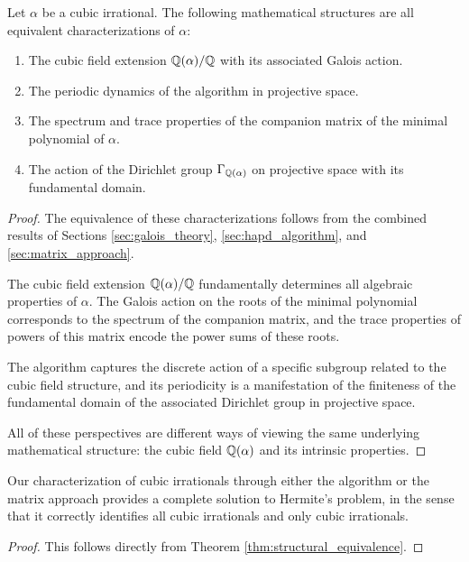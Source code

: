 \begin{theorem}\label{thm:theoretical_unification}
Let $\alpha$ be a cubic irrational. The following mathematical structures are all equivalent characterizations of $\alpha$:
\begin{enumerate}
    \item The cubic field extension $\mathbb{Q}(\alpha)/\mathbb{Q}$ with its associated Galois action.
    \item The periodic dynamics of the \HAPD{} algorithm in projective space.
    \item The spectrum and trace properties of the companion matrix of the minimal polynomial of $\alpha$.
    \item The action of the Dirichlet group $\Gamma_{\mathbb{Q}(\alpha)}$ on projective space with its fundamental domain.
\end{enumerate}
\end{theorem}

\begin{proof}
The equivalence of these characterizations follows from the combined results of Sections \ref{sec:galois_theory}, \ref{sec:hapd_algorithm}, and \ref{sec:matrix_approach}.

The cubic field extension $\mathbb{Q}(\alpha)/\mathbb{Q}$ fundamentally determines all algebraic properties of $\alpha$. The Galois action on the roots of the minimal polynomial corresponds to the spectrum of the companion matrix, and the trace properties of powers of this matrix encode the power sums of these roots.

The \HAPD{} algorithm captures the discrete action of a specific subgroup related to the cubic field structure, and its periodicity is a manifestation of the finiteness of the fundamental domain of the associated Dirichlet group in projective space.

All of these perspectives are different ways of viewing the same underlying mathematical structure: the cubic field $\mathbb{Q}(\alpha)$ and its intrinsic properties.
\end{proof}

\begin{corollary}\label{cor:completeness}
Our characterization of cubic irrationals through either the \HAPD{} algorithm or the matrix approach provides a complete solution to Hermite's problem, in the sense that it correctly identifies all cubic irrationals and only cubic irrationals.
\end{corollary}

\begin{proof}
This follows directly from Theorem \ref{thm:structural_equivalence}.
\end{proof}

